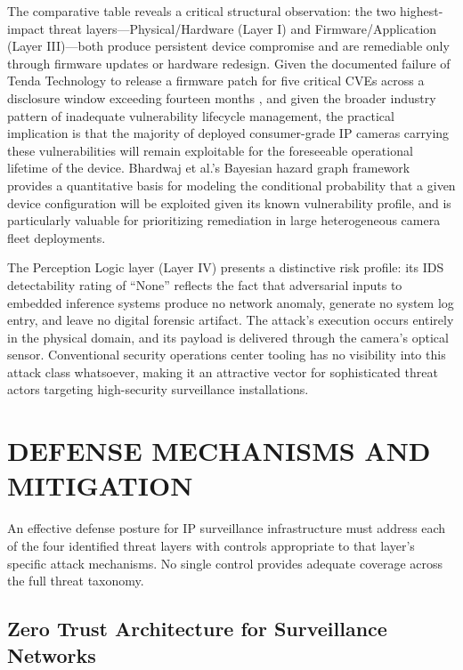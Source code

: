 \documentclass[letterpaper, 10pt, conference]{ieeeconf}
\begin{document}
The comparative table reveals a critical structural observation: the
two highest-impact threat layers---Physical/Hardware (Layer I) and
Firmware/Application (Layer III)---both produce persistent device
compromise and are remediable only through firmware updates or hardware
redesign. Given the documented failure of Tenda Technology to release
a firmware patch for five critical CVEs across a disclosure window
exceeding fourteen months \cite{stabili2024}, and given the broader
industry pattern of inadequate vulnerability lifecycle management,
the practical implication is that the majority of deployed
consumer-grade IP cameras carrying these vulnerabilities will remain
exploitable for the foreseeable operational lifetime of the device.
Bhardwaj et al.'s Bayesian hazard graph framework \cite{bhardwaj2024}
provides a quantitative basis for modeling the conditional probability
that a given device configuration will be exploited given its known
vulnerability profile, and is particularly valuable for prioritizing
remediation in large heterogeneous camera fleet deployments.

The Perception Logic layer (Layer IV) presents a distinctive risk
profile: its IDS detectability rating of ``None'' reflects the fact
that adversarial inputs to embedded inference systems produce no
network anomaly, generate no system log entry, and leave no digital
forensic artifact. The attack's execution occurs entirely in the
physical domain, and its payload is delivered through the camera's
optical sensor. Conventional security operations center tooling has
no visibility into this attack class whatsoever, making it an
attractive vector for sophisticated threat actors targeting
high-security surveillance installations.

\section{DEFENSE MECHANISMS AND MITIGATION}

An effective defense posture for IP surveillance infrastructure must
address each of the four identified threat layers with controls
appropriate to that layer's specific attack mechanisms. No single
control provides adequate coverage across the full threat taxonomy.

\subsection{Zero Trust Architecture for Surveillance Networks}
\end{document}
